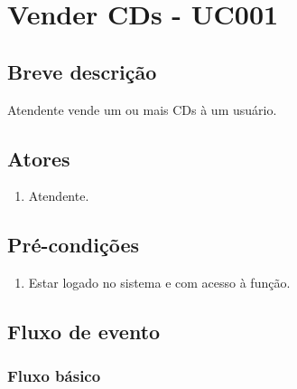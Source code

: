 \chapter{Vender CDs - UC001} \label{uc001}
 
\section{Breve descrição}

Atendente vende um ou mais CDs à um usuário.

\section{Atores}

\begin{enumerate}
	\item Atendente.
\end{enumerate}

\section{Pré-condições}

\begin{enumerate}
	\item Estar logado no sistema e com acesso à função.
\end{enumerate}

\section{Fluxo de evento}

\subsection{Fluxo básico}

